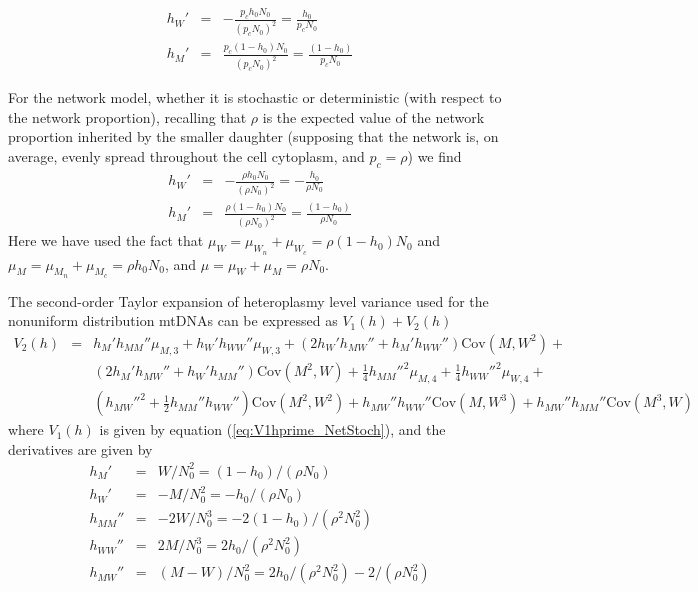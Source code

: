 \documentclass{article}
\begin{document}
\begin{eqnarray}
     h_W' & = &-\frac{p_ch_0N_0}{(p_cN_0)^2}=\frac{h_0}{p_cN_0} \label{eq:AppDerivsNullhyp}\\
     h_M' & = & \frac{p_c(1-h_0)N_0}{(p_cN_0)^2}=\frac{(1-h_0)}{p_cN_0}
\end{eqnarray}

For the network model, whether it is stochastic or deterministic (with respect to the network proportion), recalling that $\rho$ is the expected value of the network proportion inherited by the smaller daughter (supposing that the network is, on average, evenly spread throughout the cell cytoplasm, and $p_c=\rho$) we find
\begin{eqnarray}
     h_W'& =&-\frac{\rho h_0N_0}{(\rho N_0)^2}=-\frac{h_0}{\rho N_0} \label{eq:DerivsNetwork}\\
     h_M' & =&\frac{\rho (1-h_0)N_0}{(\rho N_0)^2}=\frac{(1-h_0)}{\rho N_0}
\end{eqnarray}
Here we have used the fact that $\mu_W=\mu_{W_n}+\mu_{W_c}=\rho(1-h_0)N_0$ and $\mu_M=\mu_{M_n}+\mu_{M_c}=\rho h_0N_0$, and $\mu=\mu_W+\mu_M=\rho N_0$.

The second-order Taylor expansion of heteroplasmy level variance used for the nonuniform distribution mtDNAs can be expressed as $V_1(h)+V_2(h)$
\begin{eqnarray}
  V_2(h) & = &  h_M'h_{MM}''\mu_{M,3} + h_W'h_{WW}''\mu_{W,3} + (2h_W'h_{MW}''+h_M'h_{WW}'')\mathrm{Cov}(M,W^2) + \nonumber \\
  && (2h_M'h_{MW}''+h_W'h_{MM}'')\mathrm{Cov}(M^2,W) + \frac{1}{4}h_{MM}''^2\mu_{M,4} +\frac{1}{4}h_{WW}''^2\mu_{W,4} + \nonumber \\
    & &  (h_{MW}''^2+\frac{1}{2}h_{MM}''h_{WW}'')\mathrm{Cov}(M^2,W^2) + h_{MW}''h_{WW}''\mathrm{Cov}(M,W^3)+h_{MW}''h_{MM}''\mathrm{Cov}(M^3,W)
\end{eqnarray}
where $V_1(h)$ is given by equation (\ref{eq:V1hprime_NetStoch}), and the derivatives are given by
\begin{eqnarray}
       h_M' & = & W/N_0^2 = (1-h_0)/(\rho N_0) \\
        h_W' & = & -M/N_0^2 = -h_0/(\rho N_0) \\
        h_{MM}'' & = & -2W/N_0^3=-2(1-h_0)/(\rho^2 N_0^2)\\
        h_{WW}'' & =& 2M/N_0^3=2h_0/(\rho^2N_0^2)\\
        h_{MW}'' &=& (M-W)/N_0^2=2h_0/(\rho^2N_0^2)-2/(\rho N_0^2)
\end{eqnarray}
\end{document}
